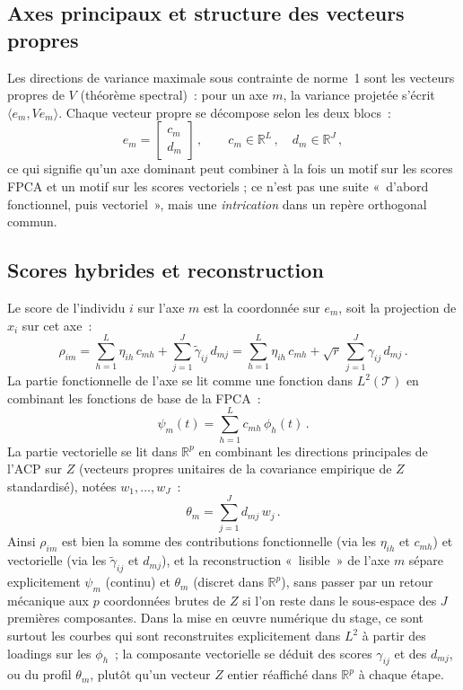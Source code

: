 \documentclass[11pt,a4paper]{article}
\newcommand{\Ltwo}{L^2(\mathcal{T})}
\begin{document}
\subsection{Axes principaux et structure des vecteurs propres}
Les directions de variance maximale sous contrainte de norme~1 sont les
vecteurs propres de $V$ (théorème spectral)~: pour un axe $m$, la variance
projetée s'écrit $\langle e_m, V e_m\rangle$. Chaque vecteur propre se décompose
selon les deux blocs~:
\begin{equation}
  e_m = \begin{bmatrix} c_m \\ d_m \end{bmatrix}\,,
  \qquad c_m\in\mathbb{R}^L\,,\quad d_m\in\mathbb{R}^J\,,
\end{equation}
ce qui signifie qu'un axe dominant peut combiner à la fois un motif sur les
scores FPCA et un motif sur les scores vectoriels ; ce n'est pas une suite
«~d'abord fonctionnel, puis vectoriel~», mais une \emph{intrication} dans un
repère orthogonal commun.

\subsection{Scores hybrides et reconstruction}
Le score de l'individu $i$ sur l'axe $m$ est la coordonnée sur $e_m$, soit la
projection de $x_i$ sur cet axe~:
\begin{equation}
  \rho_{im}
  = \sum_{h=1}^L \eta_{ih}\,c_{mh}
  + \sum_{j=1}^J \tilde{\gamma}_{ij}\,d_{mj}
  = \sum_{h=1}^L \eta_{ih}\,c_{mh}
  + \sqrt{r}\,\sum_{j=1}^J \gamma_{ij}\,d_{mj}\,.
\end{equation}
La partie fonctionnelle de l'axe se lit comme une fonction dans $\Ltwo$ en
combinant les fonctions de base de la FPCA~:
\begin{equation}
  \psi_m(t) = \sum_{h=1}^L c_{mh}\,\phi_h(t)\,.
\end{equation}
La partie vectorielle se lit dans $\mathbb{R}^p$ en combinant les directions
principales de l'ACP sur $Z$ (vecteurs propres unitaires de la covariance
empirique de $Z$ standardisé), notées $w_1,\ldots,w_J$~:
\begin{equation}
  \label{eq:theta_m}
  \theta_m = \sum_{j=1}^J d_{mj}\,w_j\,.
\end{equation}
Ainsi $\rho_{im}$ est bien la somme des contributions fonctionnelle (via les
$\eta_{ih}$ et $c_{mh}$) et vectorielle (via les $\tilde{\gamma}_{ij}$ et
$d_{mj}$), et la reconstruction «~lisible~» de l'axe $m$ sépare explicitement
$\psi_m$ (continu) et $\theta_m$ (discret dans $\mathbb{R}^p$), sans passer par
un retour mécanique aux $p$ coordonnées brutes de $Z$ si l'on reste dans le
sous-espace des $J$ premières composantes. Dans la mise en œuvre numérique du
stage, ce sont surtout les courbes qui sont reconstruites explicitement dans
$L^2$ à partir des loadings sur les $\phi_h$~; la composante vectorielle se
déduit des scores $\gamma_{ij}$ et des $d_{mj}$, ou du profil $\theta_m$, plutôt
qu'un vecteur $Z$ entier réaffiché dans $\mathbb{R}^p$ à chaque étape.
\end{document}
